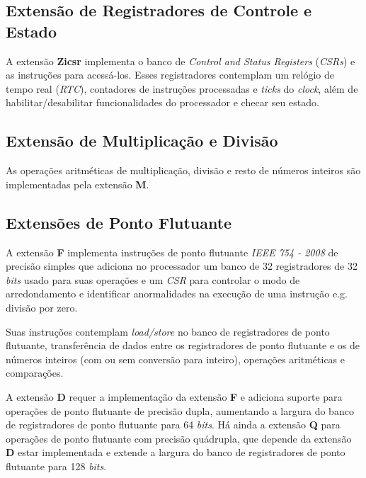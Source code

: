     \subsection{Extensão de Registradores de Controle e Estado}
    { A extensão \textbf{Zicsr} implementa o banco de \textit{Control and
        Status Registers} (\textit{CSRs}) e as instruções para acessá-los.
        Esses registradores contemplam um relógio de tempo real (\textit{RTC}),
        contadores de instruções processadas e \textit{ticks} do \textit{clock},
        além de habilitar/desabilitar funcionalidades do processador e checar
        seu estado.
    }

    \subsection{Extensão de Multiplicação e Divisão}
    { As operações aritméticas de multiplicação, divisão e resto de números
        inteiros são implementadas pela extensão \textbf{M}.
    }

    \subsection{Extensões de Ponto Flutuante}
    { A extensão \textbf{F} implementa instruções de ponto flutuante
        \textit{IEEE 754 - 2008} de precisão simples que adiciona
        no processador um banco de 32 registradores de 32 \textit{bits}
        usado para suas operações e um \textit{CSR} para controlar o modo
        de arredondamento e identificar anormalidades na execução de uma
        instrução e.g. divisão por zero.
    }

    { Suas instruções contemplam \textit{load/store} no banco de registradores
        de ponto flutuante, transferência de dados entre os registradores de
        ponto flutuante e os de números inteiros (com ou sem conversão para
        inteiro), operações aritméticas e comparações.
    }

    { A extensão \textbf{D} requer a implementação da extensão \textbf{F} e
        adiciona suporte para operações de ponto flutuante de precisão dupla,
        aumentando a largura do banco de registradores de ponto flutuante
        para 64 \textit{bits}. Há ainda a extensão \textbf{Q} para operações
        de ponto flutuante com precisão quádrupla, que depende da extensão
        \textbf{D} estar implementada e extende a largura do banco de
        registradores de ponto flutuante para 128 \textit{bits}.
    }


